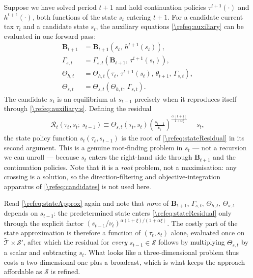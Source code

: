 \documentclass[a4paper]{article}
\begin{document}
Suppose we have solved period $t+1$ and hold continuation policies $\tau^{t+1}(\cdot)$ and $h^{t+1}(\cdot)$, both functions of the state $s_t$ entering $t+1$. For a candidate current tax $\tau_t$ and a candidate state $s_t$, the auxiliary equations \eqref{\refeq:auxiliary} can be evaluated in one forward pass:
\begin{subequations}\label{\refeq:stateApprox}
\begin{align}
    \bm{B}_{t+1} &= \bm{B}_{t+1}\left(s_t,\, h^{t+1}(s_t)\right), \label{\refeq:stateApprox:B}\\
    \Gamma_{s,t} &= \Gamma_{s,t}\left(\bm{B}_{t+1},\, \tau^{t+1}(s_t)\right), \label{\refeq:stateApprox:Gammas}\\
    \Theta_{h,t} &= \Theta_{h,t}\left(\tau_t,\, \tau^{t+1}(s_t),\, \theta_{t+1},\, \Gamma_{s,t}\right), \label{\refeq:stateApprox:Thetah}\\
    \Theta_{s,t} &= \Theta_{s,t}\left(\Theta_{h,t},\, \Gamma_{s,t}\right). \label{\refeq:stateApprox:Thetas}
\end{align}
\end{subequations}
The candidate $s_t$ is an equilibrium at $s_{t-1}$ precisely when it reproduces itself through \eqref{\refeq:auxiliary:s}. Defining the residual
\begin{align}\label{\refeq:stateResidual}
    \mathcal{R}_t\left(\tau_t, s_t;\, s_{t-1}\right) \equiv \Theta_{s,t}\left(\tau_t, s_t\right)\left(\frac{s_{t-1}}{\nu_t}\right)^{\frac{\alpha(1+\xi)}{1+\alpha\xi}}-s_t,
\end{align}
the state policy function $s_t(\tau_t, s_{t-1})$ is the root of \eqref{\refeq:stateResidual} in its second argument. This is a genuine root-finding problem in $s_t$ --- not a recursion we can unroll --- because $s_t$ enters the right-hand side through $\bm{B}_{t+1}$ and the continuation policies. Note that it is a \emph{root} problem, not a maximisation: any crossing is a solution, so the direction-filtering and objective-integration apparatus of \eqref{\refeq:candidates} is not used here.

Read \eqref{\refeq:stateApprox} again and note that \emph{none} of $\bm{B}_{t+1}$, $\Gamma_{s,t}$, $\Theta_{h,t}$, $\Theta_{s,t}$ depends on $s_{t-1}$: the predetermined state enters \eqref{\refeq:stateResidual} only through the explicit factor $(s_{t-1}/\nu_t)^{\alpha(1+\xi)/(1+\alpha\xi)}$. The costly part of the state approximation is therefore a function of $(\tau_t, s_t)$ alone, evaluated once on $\tilde{\mathcal{T}}\times\mathcal{S}'$, after which the residual for \emph{every} $s_{t-1}\in\mathcal{S}$ follows by multiplying $\Theta_{s,t}$ by a scalar and subtracting $s_t$. What looks like a three-dimensional problem thus costs a two-dimensional one plus a broadcast, which is what keeps the approach affordable as $\mathcal{S}$ is refined.
\end{document}
